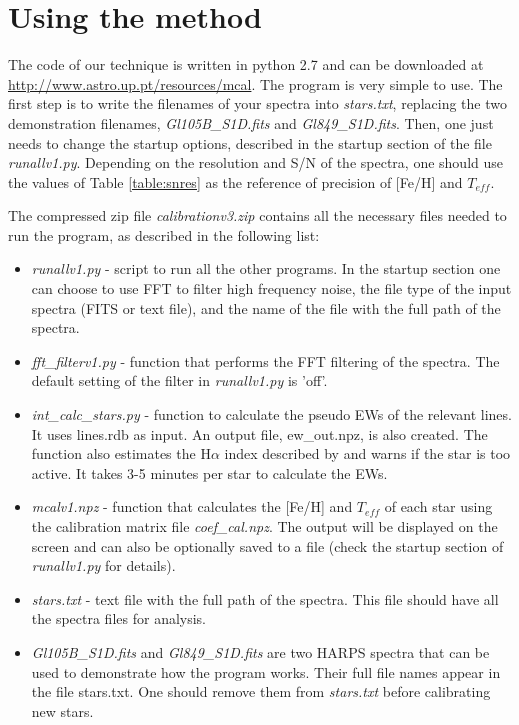 \documentclass{aa}
\begin{document}
\appendix

\section{Using the method}

The code of our technique is written in python 2.7 and can be downloaded at \url{http://www.astro.up.pt/resources/mcal}. The program is very simple to use. The first step is to write the filenames of your spectra into \textit{stars.txt}, replacing the two demonstration filenames, \textit{Gl105B\_S1D.fits} and \textit{Gl849\_S1D.fits}. Then, one just needs to change the startup options, described in the startup section of the file \textit{runallv1.py}. Depending on the resolution and S/N of the spectra, one should use the values of Table \ref{table:snres} as the reference of precision of [Fe/H] and $T_{eff}$.

The compressed zip file \textit{calibrationv3.zip} contains all the necessary files needed to run the program, as described in the following list:
\begin{itemize}
\item \textit{runallv1.py} - script to run all the other programs. In the startup section one can choose to use FFT to filter high frequency noise, the file type of the input spectra (FITS or text file), and the name of the file with the full path of the spectra.
\item \textit{fft\_filterv1.py} - function that performs the FFT filtering of the spectra.  %
The default setting of the filter in \textit{runallv1.py} is 'off'.
\item \textit{int\_calc\_stars.py} - function to calculate the pseudo EWs of the relevant lines. It uses lines.rdb as input. An output file, ew\_out.npz, is also created. The function also estimates the H$\alpha$ index described by \citet{Gomes_da_Silva-2011} and warns if the star is too active. It takes 3-5 minutes per star to calculate the EWs.
\item \textit{mcalv1.npz} - function that calculates the [Fe/H] and $T_{eff}$ of each star using the calibration matrix file \textit{coef\_cal.npz}. The output will be displayed on the screen and can also be optionally saved to a file (check the startup section of \textit{runallv1.py} for details). 
\item \textit{stars.txt} - text file with the full path of the spectra. This file should have all the spectra files for analysis.
\item \textit{Gl105B\_S1D.fits} and \textit{Gl849\_S1D.fits} are two HARPS spectra that can be used to demonstrate how the program works. Their full file names appear in the file stars.txt. One should remove them from \textit{stars.txt} before calibrating new stars.
\end{itemize}







\end{document}
